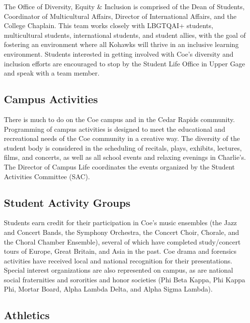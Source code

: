 \documentclass[
  letterpaper,
]{scrbook}
\begin{document}
The Office of Diversity, Equity \& Inclusion is comprised of the Dean of
Students, Coordinator of Multicultural Affairs, Director of
International Affairs, and the College Chaplain. This team works closely
with LBGTQAI+ students, multicultural students, international students,
and student allies, with the goal of fostering an environment where all
Kohawks will thrive in an inclusive learning environment. Students
interested in getting involved with Coe's diversity and inclusion
efforts are encouraged to stop by the Student Life Office in Upper Gage
and speak with a team member.

\hypertarget{campus-activities}{%
\subsection{Campus Activities}\label{campus-activities}}

There is much to do on the Coe campus and in the Cedar Rapids community.
Programming of campus activities is designed to meet the educational and
recreational needs of the Coe community in a creative way. The diversity
of the student body is considered in the scheduling of recitals, plays,
exhibits, lectures, films, and concerts, as well as all school events
and relaxing evenings in Charlie's. The Director of Campus Life
coordinates the events organized by the Student Activities Committee
(SAC).

\hypertarget{student-activity-groups}{%
\subsection{Student Activity Groups}\label{student-activity-groups}}

Students earn credit for their participation in Coe's music ensembles
(the Jazz and Concert Bands, the Symphony Orchestra, the Concert Choir,
Chorale, and the Choral Chamber Ensemble), several of which have
completed study/concert tours of Europe, Great Britain, and Asia in the
past. Coe drama and forensics activities have received local and
national recognition for their presentations. Special interest
organizations are also represented on campus, as are national social
fraternities and sororities and honor societies (Phi Beta Kappa, Phi
Kappa Phi, Mortar Board, Alpha Lambda Delta, and Alpha Sigma Lambda).

\hypertarget{athletics}{%
\subsection{Athletics}\label{athletics}}
\end{document}

